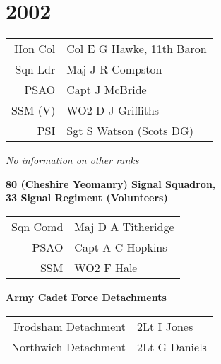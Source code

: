 \chapter*{2002}

\begin{center}
  \small
  \begin{tabular}{rl}
    Hon Col & Col E G Hawke, 11th Baron \\
    Sqn Ldr & Maj J R Compston \\
    PSAO & Capt J McBride \\
    SSM (V) & WO2 D J Griffiths \\
    PSI & Sgt S Watson (Scots DG) \\
  \end{tabular}
\end{center}

\begin{center}
  \textit{No information on other ranks}
\end{center}

\begin{center}
  \Large
  \textbf{80 (Cheshire Yeomanry) Signal Squadron, \\ 33 Signal Regiment (Volunteers)}
\end{center}

\begin{center}
  \small
  \begin{tabular}{rl}
    Sqn Comd & Maj D A Titheridge \\
    PSAO & Capt A C Hopkins \\
    SSM & WO2 F Hale \\
  \end{tabular}
\end{center}

\begin{center}
  \Large
  \textbf{Army Cadet Force Detachments}
\end{center}

\begin{center}
  \small
  \begin{tabular}{rl}
    Frodsham Detachment & 2Lt I Jones \\
    Northwich Detachment & 2Lt G Daniels \\
  \end{tabular}
\end{center}

\vspace{50mm}

\pagebreak
